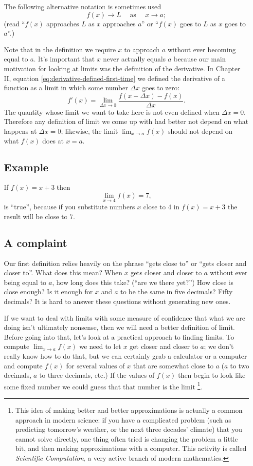 The following alternative notation is sometimes used
\[
f(x)\to L \quad\text{ as } \quad x\to a;
\]
(read ``$f(x)$ approaches $L$ as $x$ approaches $a$'' or ``$f(x)$ goes to
$L$ as $x$ goes to $a$''.)

Note that in the definition we require $x$ to approach $a$ without
ever becoming equal to $a$.  It's important that $x$ never actually
equals $a$ because our main motivation for looking at limits was
the definition of the derivative.  In Chapter II, equation
\eqref{eq:derivative-defined-first-time} we defined the derivative of
a function as a limit in which some number $\Delta x$ goes to zero:
\[
f'(x) = \lim_{\Delta x\to0} \frac{f(x+\Delta x)-f(x)}{\Delta x}.
\]
The quantity whose limit we want to take here is not even defined when
$\Delta x=0$.  Therefore any definition of limit we come up with had
better not depend on what happens at $\Delta x=0$; likewise, the limit
$\lim_{x\to a}f(x)$ should not depend on what $f(x)$ does at $x=a$.
\subsection{Example} 
If $f(x) = x+3$ then
\[
\lim_{x\to 4} f(x) = 7,
\]
is ``true'', because if you substitute numbers $x$ close to $4$ in $f(x) = x+3$
the result will be close to $7$.
\subsection{A complaint} 
Our first definition relies heavily on the
phrase ``gets close to'' or ``gets closer and closer to''.  What does
this mean?  When $x$ gets closer and closer to $a$ without ever being
equal to $a$, how long does this take? (``are we there yet?'') How
close is close enough?  Is it enough for $x$ and $a$ to be the same in
five decimals?  Fifty decimals?  It is hard to answer these questions without
generating new ones.

If we want to deal with limits with some measure of confidence that what we are
doing isn't ultimately nonsense, then we will need a better definition of limit.
Before going into that, let's look at a practical approach to finding limits.
To compute $\lim_{x\to a} f(x)$ we need to let $x$ get closer and closer to $a$;
we don't really know how to do that, but we can certainly grab a calculator or a
computer and compute $f(x)$ for several values of $x$ that are somewhat close to
$a$ ($a$ to two decimals, $a$ to three decimals, etc.)  If the values of $f(x)$
then begin to look like some fixed number we could guess that that number is the
limit \footnote{This idea of making better and better approximations is actually
a common approach in modern science: if you have a complicated problem (such as
predicting tomorrow's weather, or the next three decades' climate) that you
cannot solve directly, one thing often tried is changing the problem a little
bit, and then making approximations with a computer.  This activity is called
\emph{Scientific Computation}, a very active branch of modern mathematics.}.  

